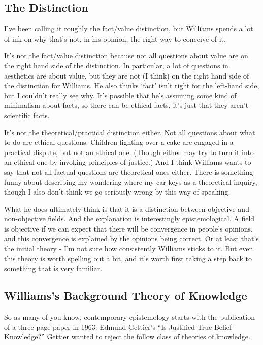 \documentclass[
]{article}
\begin{document}
\hypertarget{the-distinction}{%
\subsection{The Distinction}\label{the-distinction}}

I've been calling it roughly the fact/value distinction, but Williams
spends a lot of ink on why that's not, in his opinion, the right way to
conceive of it.

It's not the fact/value distinction because not all questions about
value are on the right hand side of the distinction. In particular, a
lot of questions in aesthetics are about value, but they are not (I
think) on the right hand side of the distinction for Williams. He also
thinks `fact' isn't right for the left-hand side, but I couldn't really
see why. It's possible that he's assuming some kind of minimalism about
facts, so there can be ethical facts, it's just that they aren't
scientific facts.

It's not the theoretical/practical distinction either. Not all questions
about what to do are ethical questions. Children fighting over a cake
are engaged in a practical dispute, but not an ethical one. (Though
either may try to turn it into an ethical one by invoking principles of
justice.) And I think Williams wants to say that not all factual
questions are theoretical ones either. There is something funny about
describing my wondering where my car keys as a theoretical inquiry,
though I also don't think we go seriously wrong by this way of speaking.

What he does ultimately think is that it is a distinction between
objective and non-objective fields. And the explanation is interestingly
epistemological. A field is objective if we can expect that there will
be convergence in people's opinions, and this convergence is explained
by the opinions being correct. Or at least that's the initial theory -
I'm not sure how consistently Williams sticks to it. But even this
theory is worth spelling out a bit, and it's worth first taking a step
back to something that is very familiar.

\hypertarget{williamss-background-theory-of-knowledge}{%
\subsection{Williams's Background Theory of
Knowledge}\label{williamss-background-theory-of-knowledge}}

So as many of you know, contemporary epistemology starts with the
publication of a three page paper in 1963: Edmund Gettier's ``Is
Justified True Belief Knowledge?'' Gettier wanted to reject the follow
class of theories of knowledge.
\end{document}
